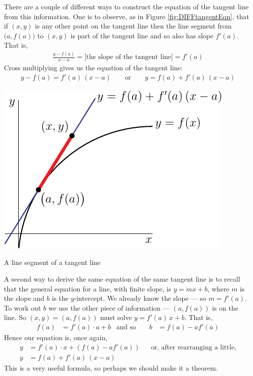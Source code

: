 \noindent
There are a couple of different ways to construct the equation of the tangent
line from this information. One is to observe, as in
Figure \ref{fig:DIFFtangentEqn}, that if $(x,y)$ is any
other point on the tangent line then the line segment from $\big(a,f(a)\big)$
to $(x,y)$ is part of the tangent line and so also has slope $f'(a)$.
That is,
\begin{align*}
\frac{y- f(a)}{x-a} =\big[\text{the slope of the tangent line}\big]
  =f'(a)
\end{align*}
Cross multiplying gives us the equation of the tangent line:
\begin{align*}
y-f(a) = f'(a)\,(x-a)\qquad\text{or}\qquad
y=f(a)+f'(a)\,(x-a)
\end{align*}
\begin{fig}
\label{fig:DIFFtangentEqn}
  \begin{center}
  \includegraphics{tangentB}

  A line segment of a tangent line
  \end{center}
\end{fig}


A second way to derive the same equation of the same tangent line is
to recall that the general equation for a line, with finite  slope,
is $y=mx+b$, where $m$ is the slope and $b$ is the $y$-intercept.
We already know the slope --- so $m=f'(a)$. To work out $b$ we use
the other piece of information --- $(a,f(a))$ is on the line.
So $(x,y)=(a,f(a))$ must solve $y=f'(a)\,x+b$. That is,
\begin{align*}
  f(a) &= f'(a) \cdot a + b & \text{and so } &&  b&=f(a)- af'(a)
\end{align*}
Hence our equation is, once again,
\begin{align*}
  y &= f'(a) \cdot x + \left(f(a)-af'(a) \right)
            && \text{or, after rearranging a little,} \\
  y &= f(a) + f'(a) \, (x-a)
\end{align*}
This is a very useful formula, so perhaps we should make it a theorem.


